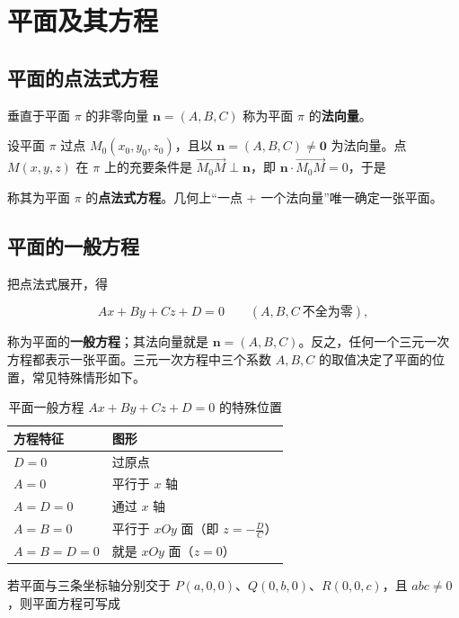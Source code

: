 \section{平面及其方程}

\subsection{平面的点法式方程}

\begin{definition}
垂直于平面 $\pi$ 的非零向量 $\boldsymbol{n}=(A,B,C)$ 称为平面 $\pi$ 的\textbf{法向量}。
\end{definition}

设平面 $\pi$ 过点 $M_0(x_0,y_0,z_0)$，且以 $\boldsymbol{n}=(A,B,C)\neq\boldsymbol{0}$ 为法向量。点 $M(x,y,z)$ 在 $\pi$ 上的充要条件是 $\overrightarrow{M_0M}\perp\boldsymbol{n}$，即 $\boldsymbol{n}\cdot\overrightarrow{M_0M}=0$，于是


称其为平面 $\pi$ 的\textbf{点法式方程}。几何上“一点 + 一个法向量”唯一确定一张平面。

\subsection{平面的一般方程}

把点法式展开，得

\[
Ax+By+Cz+D=0\qquad(A,B,C\ \text{不全为零}),
\]

称为平面的\textbf{一般方程}；其法向量就是 $\boldsymbol{n}=(A,B,C)$。反之，任何一个三元一次方程都表示一张平面。三元一次方程中三个系数 $A,B,C$ 的取值决定了平面的位置，常见特殊情形如下。

\begin{table}[htbp]
\centering
\renewcommand{\tablename}{表}
\caption{平面一般方程 $Ax+By+Cz+D=0$ 的特殊位置}
\begin{tabular}{@{}ll@{}}
\toprule
方程特征 & 图形 \\
\midrule
$D=0$ & 过原点 \\
$A=0$ & 平行于 $x$ 轴 \\
$A=D=0$ & 通过 $x$ 轴 \\
$A=B=0$ & 平行于 $xOy$ 面（即 $z=-\frac{D}{C}$）\\
$A=B=D=0$ & 就是 $xOy$ 面（$z=0$）\\
\bottomrule
\end{tabular}
\end{table}

若平面与三条坐标轴分别交于 $P(a,0,0)$、$Q(0,b,0)$、$R(0,0,c)$，且 $abc\neq0$，则平面方程可写成

